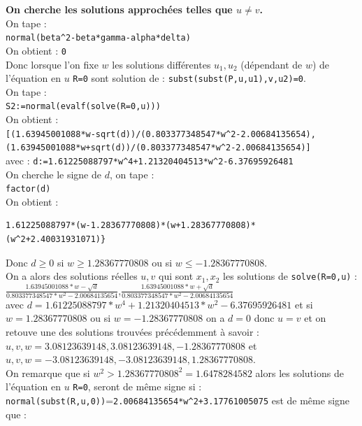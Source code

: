 \documentclass[a4paper,11pt]{book}
\begin{document}
{\bf On cherche les solutions approch\'ees telles que $u\neq v$.}\\
On  tape :\\
{\tt normal(beta\verb|^|2-beta*gamma-alpha*delta)}\\
On obtient : {\tt 0}\\
Donc lorsque l'on fixe $w$ les solutions diff\'erentes $u_1,u_2$ (d\'ependant 
de $w$) de l'\'equation en $u$ {\tt R=0} sont solution de : 
{\tt subst(subst(P,u,u1),v,u2)=0}.\\
On tape :\\
{\tt S2:=normal(evalf(solve(R=0,u)))}\\
On obtient : \\
{\tt [(1.63945001088*w-sqrt(d))/(0.803377348547*w\verb|^|2-2.00684135654),}\\
{\tt (1.63945001088*w+sqrt(d))/(0.803377348547*w\verb|^|2-2.00684135654)]}\\
avec :
{\tt d:=1.61225088797*w\verb|^|4+1.21320404513*w\verb|^|2-6.37695926481}\\
On cherche le signe de $d$, on tape :\\
{\tt factor(d)}\\
On obtient :
\begin{verbatim}
1.61225088797*(w-1.28367770808)*(w+1.28367770808)*
(w^2+2.40031931071)}
\end{verbatim}
Donc $d\geq 0$ si $w\geq 1.28367770808$ ou si $w\leq -1.28367770808$.\\
On a alors des solutions 
r\'eelles $u,v$ qui sont $x_1,x_2$ les solutions de {\tt solve(R=0,u)} :\\
$\displaystyle \frac{1.63945001088*w-\sqrt d}{0.803377348547*w^2-2.00684135654}$,$\displaystyle \frac{1.63945001088*w+\sqrt d}{0.803377348547*w^2-2.00684135654}$\\
avec $d=1.61225088797*w^4+1.21320404513*w^2-6.37695926481$
et si $w=1.28367770808$ ou si $w=-1.28367770808$ on a $d=0$ donc $u=v$ et on 
retouve une des solutions trouv\'ees pr\'ec\'edemment \`a savoir :\\
$u,v,w=3.08123639148, 3.08123639148,-1.28367770808$ et \\
$u,v,w=-3.08123639148, -3.08123639148,1.28367770808$. \\
On remarque que si $w^2>1.28367770808^2=1.6478284582$ alors les solutions de 
l'\'equation en $u$ {\tt R=0}, seront de m\^eme signe si :\\
 {\tt normal(subst(R,u,0))}={\tt 2.00684135654*w\verb|^|2+3.17761005075}
 est de m\^eme signe que :\\
\end{document}
